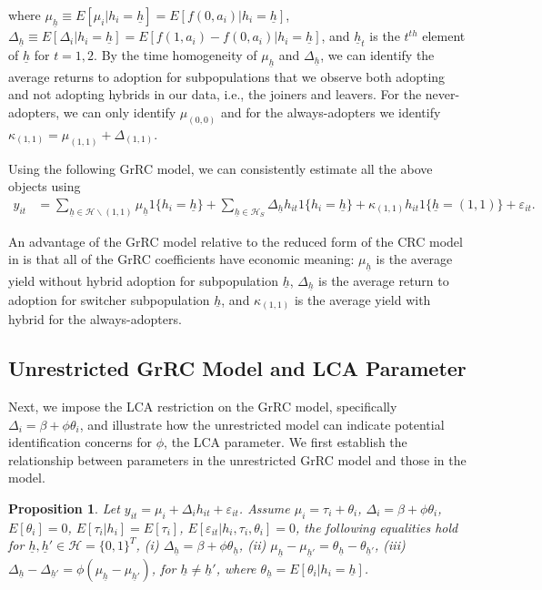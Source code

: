 \documentclass[12pt]{article}
\theoremstyle{plain}
\newtheorem{prop}{Proposition}
\theoremstyle{definition}
\begin{document}
\noindent where $\mu_{\underline{h}}\equiv E[\mu_{i}|h_{i}=\underline{h}]=E[f(0,a_i)|h_i=\underline{h}]$, $\Delta_{\underline{h}} \equiv E[\Delta_{i}|h_{i}=\underline{h}]=E[f(1,a_i)-f(0,a_i)|h_i=\underline{h}]$, and $\underline{h}_t$ is the $t^{th}$ element of $\underline{h}$ for $t=1,2$. 
By the time homogeneity of $\mu_{\underline{h}}$ and $\Delta_{\underline{h}}$, we can identify the average returns to adoption for subpopulations that we observe both adopting and not adopting hybrids in our data, i.e., the joiners and leavers.
For the never-adopters, we can only identify $\mu_{(0,0)}$ and for the always-adopters we identify $\kappa_{(1,1)}=\mu_{(1,1)}+\Delta_{(1,1)}$.

Using the following GrRC model, we can consistently estimate all the above objects using
\begin{align}
y_{it}&=\sum_{\underline{h}\in\mathcal{H}\backslash (1,1)}\mu_{\underline{h}}1\{h_{i}=\underline{h}\}+\sum_{\underline{h}\in\mathcal{H}_{S}}\Delta_{\underline{h}}h_{it}1\{h_{i}=\underline{h}\}+\kappa_{(1,1)}h_{it}1\{\underline{h}=(1,1)\}+\varepsilon_{it}.\label{eq:GrRC}
\end{align}

\noindent An advantage of the GrRC model relative to the reduced form of the CRC model in \citet{S2011} is that all of the GrRC coefficients have economic meaning: $\mu_{\underline{h}}$ is the average yield without hybrid adoption for subpopulation $\underline{h}$, $\Delta_{\underline{h}}$ is the average return to adoption for switcher subpopulation $\underline{h}$, and $\kappa_{(1,1)}$ is the average yield with hybrid for the always-adopters.


\subsection{Unrestricted GrRC Model and LCA Parameter}\label{sec:suri_id}

Next, we impose the LCA restriction on the GrRC model, specifically $\Delta_i=\beta+\phi \theta_i$, and illustrate how the unrestricted model can indicate potential identification concerns for $\phi$, the LCA parameter. 
We first establish the relationship between parameters in the unrestricted GrRC model and those in the \citet{S2011} model.

\begin{prop}\label{prop:SuriGrRC}  Let $y_{it}=\mu_{i}+\Delta_{i}h_{it}+\varepsilon_{it}$. Assume $\mu_i=\tau_{i}+\theta_{i}$, $\Delta_{i}=\beta+\phi\theta_{i}$, $E[\theta_{i}]=0$, $E[\tau_{i}|h_{i}]=E[\tau_{i}]$, $E[\varepsilon_{it}|h_{i},\tau_{i},\theta_{i}]=0$, the following equalities hold for $\underline{h},\underline{h}'\in\mathcal{H}=\{0,1\}^{T}$,
(i) $\Delta_{\underline{h}}=\beta+\phi \theta_{\underline{h}}$, (ii) $\mu_{\underline{h}}-\mu_{\underline{h}'}=\theta_{\underline{h}}-\theta_{\underline{h}'}$, (iii) $\Delta_{\underline{h}}-\Delta_{\underline{h}'}=\phi\left(\mu_{\underline{h}}-\mu_{\underline{h}'}\right)$, for $\underline{h}\neq \underline{h}'$,  where $\theta_{\underline{h}}=E[\theta_{i}|h_{i}=\underline{h}]$.
\end{prop}
\end{document}
